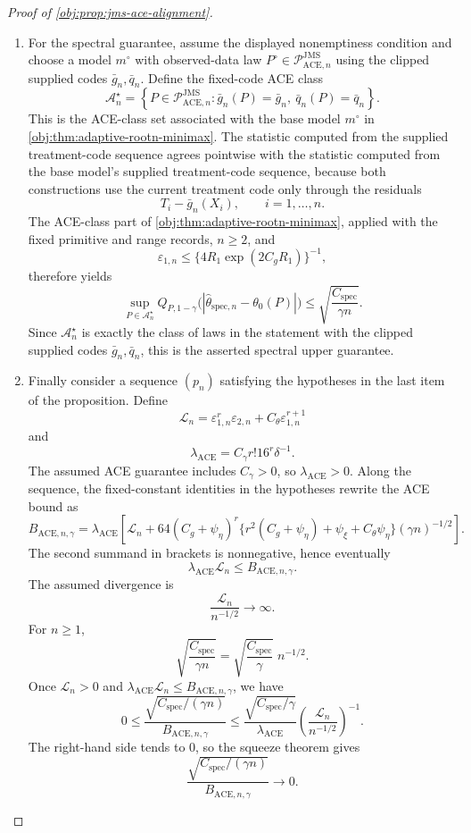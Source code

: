 \documentclass[11pt]{article}
\begin{document}
\begin{proof}[Proof of \cref{obj:prop:jms-ace-alignment}]
\begin{enumerate}
\item For the spectral guarantee, assume the displayed nonemptiness condition
and choose a model \(m^{\circ}\) with observed-data law
\(P^{\circ}\in\mathcal P_{\mathrm{ACE},n}^{\mathrm{JMS}}\) using the clipped
supplied codes \(\bar g_n,\bar q_n\).  Define the fixed-code ACE class
\[
 \mathcal A_n^{\star}
 =
 \left\{
 P\in\mathcal P_{\mathrm{ACE},n}^{\mathrm{JMS}}:
 \bar g_n(P)=\bar g_n,\ \bar q_n(P)=\bar q_n
 \right\}.
\]
This is the ACE-class set associated with the base model \(m^{\circ}\) in
\cref{obj:thm:adaptive-rootn-minimax}.  The statistic computed from the
supplied treatment-code sequence agrees pointwise with the statistic computed
from the base model's supplied treatment-code sequence, because both
constructions use the current treatment code only through the residuals
\[
  T_i-\bar g_n(X_i),\qquad i=1,\ldots,n .
\]
The ACE-class part of \cref{obj:thm:adaptive-rootn-minimax}, applied with the
fixed primitive and range records, \(n\ge2\), and
\[
 \varepsilon_{1,n}
 \le
 \{4R_1\exp(2C_gR_1)\}^{-1},
\]
therefore yields
\[
 \sup_{P\in\mathcal A_n^{\star}}
 Q_{P,1-\gamma}
 \bigl(|\widehat\theta_{\mathrm{spec},n}-\theta_0(P)|\bigr)
 \le
 \sqrt{\frac{C_{\mathrm{spec}}}{\gamma n}} .
\]
Since \(\mathcal A_n^{\star}\) is exactly the class of laws in the statement
with the clipped supplied codes \(\bar g_n,\bar q_n\), this is the asserted
spectral upper guarantee.

\item Finally consider a sequence \((p_n)\) satisfying the hypotheses in the
last item of the proposition.  Define
\[
  \mathcal L_n
  =
  \varepsilon_{1,n}^r\varepsilon_{2,n}
  +C_{\theta}\varepsilon_{1,n}^{r+1}
\]
and
\[
  \lambda_{\mathrm{ACE}}
  =
  C_{\gamma}r!16^r\delta^{-1}.
\]
The assumed ACE guarantee includes \(C_{\gamma}>0\), so
\(\lambda_{\mathrm{ACE}}>0\).  Along the sequence, the fixed-constant
identities in the hypotheses rewrite the ACE bound as
\[
 B_{\mathrm{ACE},n,\gamma}
 =
 \lambda_{\mathrm{ACE}}
 \left[
   \mathcal L_n
   +
   64(C_g+\psi_{\eta})^r
   \{r^2(C_g+\psi_{\eta})+\psi_{\xi}+C_{\theta}\psi_{\eta}\}
   (\gamma n)^{-1/2}
 \right].
\]
The second summand in brackets is nonnegative, hence eventually
\[
  \lambda_{\mathrm{ACE}}\mathcal L_n
  \le B_{\mathrm{ACE},n,\gamma}.
\]
The assumed divergence is
\[
  \frac{\mathcal L_n}{n^{-1/2}}\longrightarrow\infty .
\]
For \(n\ge1\),
\[
 \sqrt{\frac{C_{\mathrm{spec}}}{\gamma n}}
 =
 \sqrt{\frac{C_{\mathrm{spec}}}{\gamma}}\;n^{-1/2}.
\]
Once \(\mathcal L_n>0\) and
\(\lambda_{\mathrm{ACE}}\mathcal L_n\le B_{\mathrm{ACE},n,\gamma}\), we have
\[
 0\le
 \frac{\sqrt{C_{\mathrm{spec}}/(\gamma n)}}{B_{\mathrm{ACE},n,\gamma}}
 \le
 \frac{\sqrt{C_{\mathrm{spec}}/\gamma}}{\lambda_{\mathrm{ACE}}}
 \left(\frac{\mathcal L_n}{n^{-1/2}}\right)^{-1}.
\]
The right-hand side tends to \(0\), so the squeeze theorem gives
\[
 \frac{
   \sqrt{C_{\mathrm{spec}}/(\gamma n)}
 }{
   B_{\mathrm{ACE},n,\gamma}
 }
 \longrightarrow 0 .
\]
\end{enumerate}
\end{proof}
\end{document}
